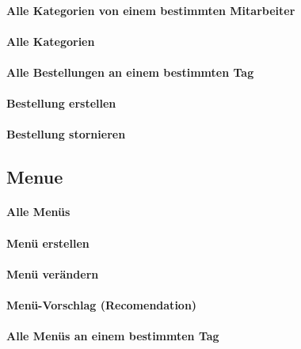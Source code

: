 \paragraph{Alle Kategorien von einem bestimmten Mitarbeiter}

\paragraph{Alle Kategorien}

\paragraph{Alle Bestellungen an einem bestimmten Tag}

\paragraph{Bestellung erstellen}

\paragraph{Bestellung stornieren}



\subsection{Menue}

\paragraph{Alle Menüs}

\paragraph{Menü erstellen}

\paragraph{Menü verändern}

\paragraph{Menü-Vorschlag (Recomendation)}

\paragraph{Alle Menüs an einem bestimmten Tag}


